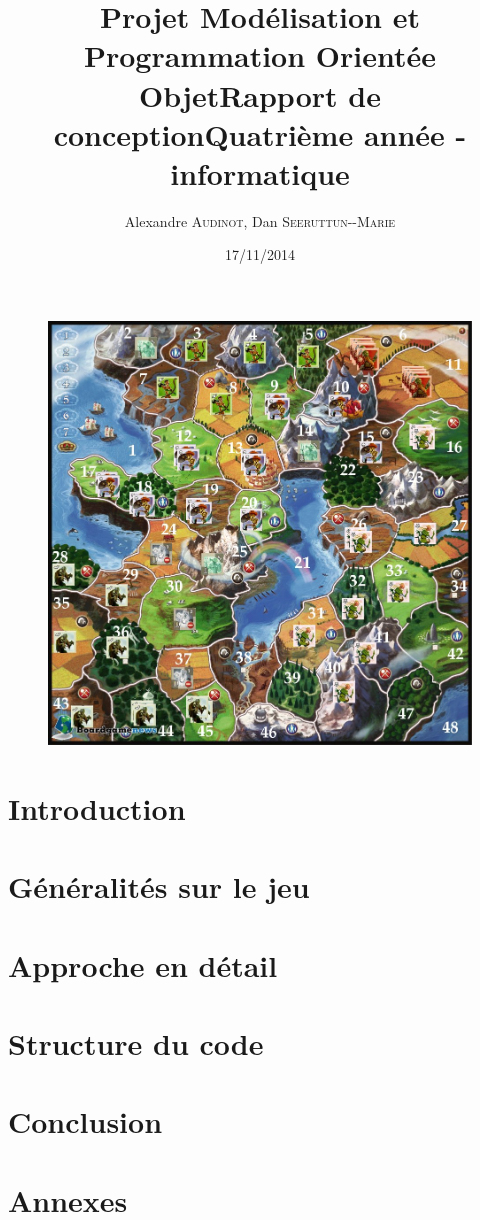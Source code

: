 \documentclass[12pt]{article}
\title{Projet Modélisation et Programmation Orientée Objet\smallbreak Rapport de conception\smallbreak Quatrième année - informatique }
\author{Alexandre \textsc{Audinot},  Dan \textsc{Seeruttun-{}-Marie}}
\date{17/11/2014}
\begin{document}
\maketitle

\begin{figure}[!h] 
\centerline{\includegraphics[scale=0.30]{img/cover.jpg}}
\end{figure}
\newpage

\newpage
\tableofcontents
\newpage
\newpage


\section{Introduction}

\newpage
\section{Généralités sur le jeu}

\newpage
\section{Approche en détail}

\newpage
\section{Structure du code}

\newpage
\section{Conclusion}

\newpage
\section{Annexes}

\end{document}
